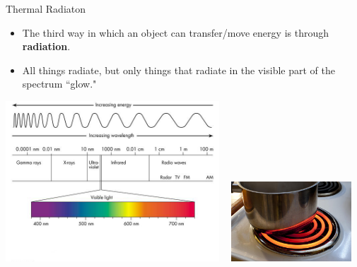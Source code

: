 \documentclass{beamer}
\begin{document}
\begin{frame}[t]{Thermal Radiaton}
\begin{itemize}
   \item The third way in which an object can transfer/move energy is through {\bf radiation}.
   \item All things radiate, but only things that radiate in the visible part of the spectrum ``glow."
\end{itemize}
\begin{center}
   \includegraphics[width=8.0cm]{figures/EMspectrum.jpg}
   ~ 
   \includegraphics[width=4.5cm]{figures/pan_on_stove.jpg}
\end{center}
\end{frame}
\end{document}
